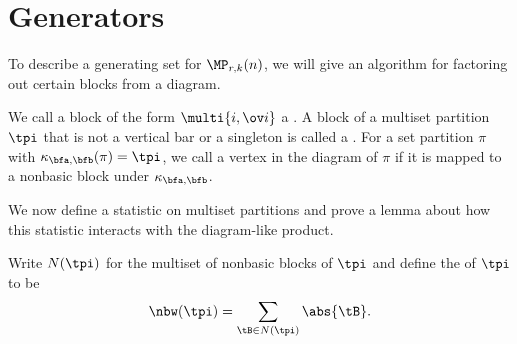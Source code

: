 \section{Generators}\label{sec:generators}

To describe a generating set for $\MP_{r,k}(n)$, we will give an algorithm for factoring out certain blocks from a diagram. 

\begin{defi}
    We call a block of the form $\multi{i,\ov i}$ a . A block of a multiset partition $\tpi$ that is not a vertical bar or a singleton is called a . For a set partition $\pi$ with $\kappa_{\bfa,\bfb}(\pi)=\tpi$, we call a vertex in the diagram of $\pi$  if it is mapped to a nonbasic block under $\kappa_{\bfa,\bfb}$.
\end{defi}

We now define a statistic on multiset partitions and prove a lemma about how this statistic interacts with the diagram-like product.

\begin{defi}
    Write $N(\tpi)$ for the multiset of nonbasic blocks of $\tpi$ and define the  of $\tpi$ to be \[\nbw(\tpi)=\sum_{\tB\in N(\tpi)}\abs{\tB}.\]
\end{defi}

